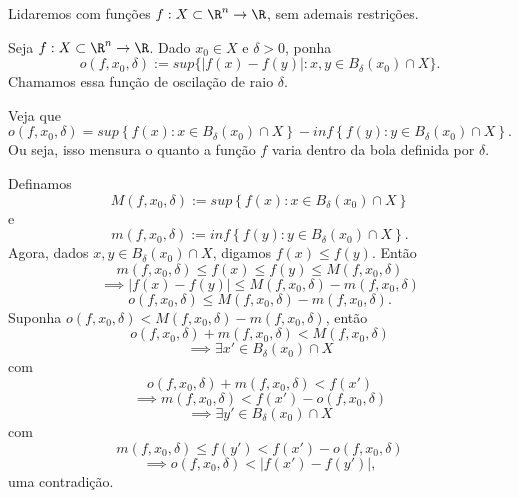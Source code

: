 Lidaremos com funções $f:X\subset \R^{n}\to \R$, sem ademais restrições.

\begin{definition}
    Seja $f:X\subset \R^{n}\to \R$. Dado $x_0\in X$ e $\delta > 0$, ponha \[
	o\left( f, x_0, \delta \right) := sup \{\left| f\left( x \right) -f\left( y \right)  \right| : x,y \in B_\delta \left( x_0 \right) \cap X\} 
    .\] Chamamos essa função de oscilação de raio  $\delta$.
\end{definition}

\begin{observe}
    Veja que \[
    o\left( f, x_0, \delta \right) = sup \left\{ f\left( x \right) : x\in B_{\delta}\left( x_0 \right) \cap X \right\}  - inf \left\{ f\left( y \right) : y\in B_\delta \left( x_0 \right) \cap X \right\} 
    .\] Ou seja, isso mensura o quanto a função $f$ varia dentro da bola definida por $\delta$.

    Definamos \[
    M\left( f, x_0, \delta \right) := sup \left\{ f\left( x \right) : x\in B_{\delta}\left( x_0 \right) \cap X \right\}
    \] e \[
    m\left( f, x_0, \delta \right) := inf \left\{ f\left( y \right) : y\in B_\delta \left( x_0 \right) \cap X \right\} 
    .\] Agora, dados $x, y \in  B_\delta \left( x_0 \right) \cap X$, digamos $f\left( x \right) \le f\left( y \right) $. Então \[
    m\left( f,x_0,\delta \right) \le f\left( x \right) \le f\left( y \right) \le M\left( f,x_0,\delta \right) 
    \] \[
    \implies \left| f\left( x \right) -f\left( y \right)  \right| \le M\left( f,x_0,\delta \right) - m\left( f,x_0,\delta \right)
    \] \[
    o\left( f,x_0,\delta \right) \le M\left( f,x_0,\delta \right) - m\left( f,x_0,\delta \right)
    .\] Suponha $o\left( f,x_0,\delta \right) < M\left( f,x_0,\delta \right)-m\left( f,x_0,\delta \right)$, então \[
    o\left( f,x_0,\delta \right) + m\left( f,x_0,\delta \right) < M\left( f,x_0,\delta \right)
    \] \[
    \implies \exists x' \in B_\delta \left( x_0 \right) \cap X
    \] com \[
    o\left( f,x_0,\delta \right) + m\left( f,x_0,\delta \right) < f\left( x' \right) 
    \] \[
    \implies m\left( f,x_0,\delta \right) < f\left( x' \right) -o\left( f,x_0,\delta \right)
    \] \[
    \implies \exists y' \in B_\delta \left( x_0 \right) \cap X
    \] com \[
    m\left( f,x_0,\delta \right)\le f\left( y' \right) <f\left( x' \right) -o\left( f,x_0,\delta \right)
    \] \[
    \implies o\left( f,x_0,\delta \right) < \left| f\left( x' \right) - f\left( y' \right)   \right| 
    ,\] uma contradição.
\end{observe}

